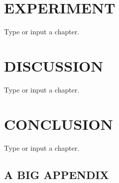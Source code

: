 \documentclass[dissertation]{uathesis}
\begin{document}
\begin{body}
\chapter{EXPERIMENT}
Type or input{} a chapter. \cite{rocket-themoon2167}

\chapter{DISCUSSION}
Type or input{} a chapter. \cite{rocket-themoon2167}

\chapter{CONCLUSION}
Type or input{} a chapter. \cite{rocket-themoon2167}


\renewcommand{\bibsection}{\topskip=1in\chapter*{REFERENCES}\topskip=0in \addcontentsline{toc}{chapter}{REFERENCES}}




\begin{appendices}
\renewcommand{\appendixname}{APPENDIX}

\chapter{A BIG APPENDIX}

\end{appendices}

\end{body}
\end{document}
